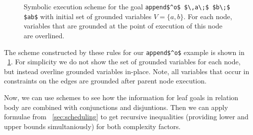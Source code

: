\begin{figure}[t]
\begin{center}
\end{center}

\caption{Symbolic execution scheme for the goal  \lstinline|append$^o$ $\,a\;$ $b\;$ $ab$|  with initial set of grounded variables $V = \{ a, b \}$. For each node, variables that
  are grounded at the point of execution of this node are overlined. }
\label{fig:example_scheme}
\end{figure}

The scheme constructed by these rules for our \lstinline|append$^o$| example is shown in \figureword~\ref{fig:example_scheme}. For simplicity we do not show the set of grounded
variables for each node, but instead overline grounded variables in-place. Note, all variables that occur in constraints on the edges are grounded after parent node execution.

Now, we can use schemes to see how the information for leaf goals in relation body are combined with conjunctions and disjuntions. Then we can apply formulae
from \sectionword~\ref{sec:scheduling} to get recursive inequalities (providing lower and upper bounds simultaniously) for both complexity factors.

